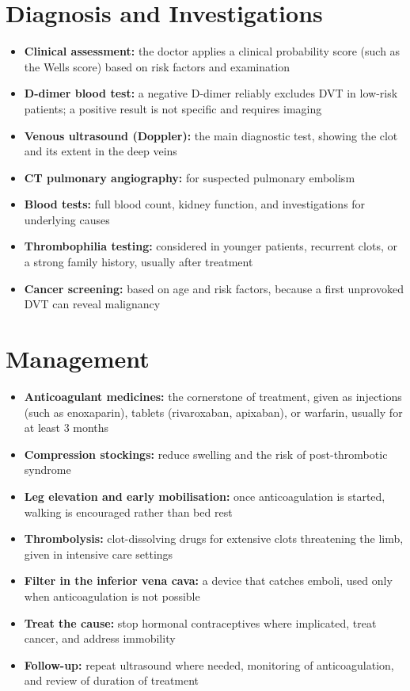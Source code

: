 \section*{Diagnosis and Investigations}
\begin{itemize}
    \item \textbf{Clinical assessment:} the doctor applies a clinical probability score (such as the Wells score) based on risk factors and examination
    \item \textbf{D-dimer blood test:} a negative D-dimer reliably excludes DVT in low-risk patients; a positive result is not specific and requires imaging
    \item \textbf{Venous ultrasound (Doppler):} the main diagnostic test, showing the clot and its extent in the deep veins
    \item \textbf{CT pulmonary angiography:} for suspected pulmonary embolism
    \item \textbf{Blood tests:} full blood count, kidney function, and investigations for underlying causes
    \item \textbf{Thrombophilia testing:} considered in younger patients, recurrent clots, or a strong family history, usually after treatment
    \item \textbf{Cancer screening:} based on age and risk factors, because a first unprovoked DVT can reveal malignancy
\end{itemize}

\section*{Management}
\begin{itemize}
    \item \textbf{Anticoagulant medicines:} the cornerstone of treatment, given as injections (such as enoxaparin), tablets (rivaroxaban, apixaban), or warfarin, usually for at least 3 months
    \item \textbf{Compression stockings:} reduce swelling and the risk of post-thrombotic syndrome
    \item \textbf{Leg elevation and early mobilisation:} once anticoagulation is started, walking is encouraged rather than bed rest
    \item \textbf{Thrombolysis:} clot-dissolving drugs for extensive clots threatening the limb, given in intensive care settings
    \item \textbf{Filter in the inferior vena cava:} a device that catches emboli, used only when anticoagulation is not possible
    \item \textbf{Treat the cause:} stop hormonal contraceptives where implicated, treat cancer, and address immobility
    \item \textbf{Follow-up:} repeat ultrasound where needed, monitoring of anticoagulation, and review of duration of treatment
\end{itemize}

